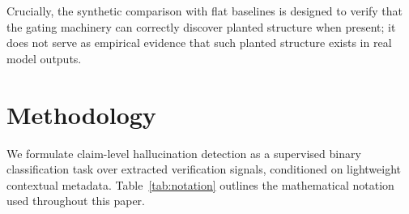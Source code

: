 \documentclass[pdflatex,sn-mathphys,Numbered]{sn-jnl}
\begin{document}
Crucially, the synthetic comparison with flat baselines is designed to verify that the gating machinery can correctly discover planted structure when present; it does not serve as empirical evidence that such planted structure exists in real model outputs.

\section{Methodology}\label{sec:method}

We formulate claim-level hallucination detection as a supervised binary classification task over extracted verification signals, conditioned on lightweight contextual metadata. Table~\ref{tab:notation} outlines the mathematical notation used throughout this paper.
\end{document}
